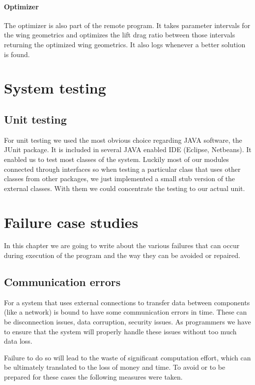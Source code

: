 \documentclass[10pt,a4paper]{report}
\begin{document}
\subsubsection{Optimizer}
The optimizer is also part of the remote program. It takes parameter intervals for the wing geometrics and optimizes the lift drag ratio between those intervals returning the optimized wing geometrics. It also logs whenever a better solution is found.


\chapter{System testing}
\label{ch:test}
\section{Unit testing}
For unit testing we used the most obvious choice regarding JAVA software, the JUnit package. It is included in several JAVA enabled IDE (Eclipse, Netbeans). It enabled us to test most classes of the system. Luckily most of our modules connected through interfaces so when testing a particular class that uses other classes from other packages, we just implemented a small stub version of the external classes. With them we could concentrate the testing to our actual unit.

\chapter{Failure case studies}
\label{ch:fail}
In this chapter we are going to write about the various failures that can occur during execution of the program and the way they can be avoided or repaired.

\section{Communication errors}
For a system that uses external connections to transfer data between components (like a network) is bound to have some communication errors in time. These can be disconnection issues, data corruption, security issues. As programmers we have to ensure that the system will properly handle these issues without too much data loss.

Failure to do so will lead to the waste of significant computation effort, which can be ultimately translated to the loss of money and time. To avoid or to be prepared for these cases the following measures were taken.
\end{document}
